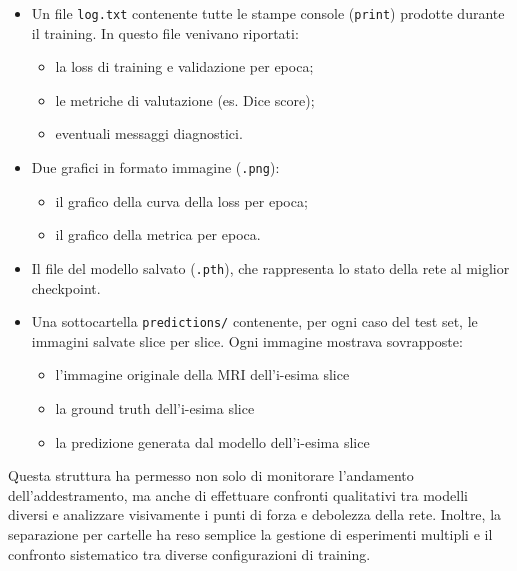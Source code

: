 \begin{itemize}
\item Un file \texttt{log.txt} contenente tutte le stampe console (\texttt{print}) prodotte durante il training. In questo file venivano riportati:
\begin{itemize}
\item la loss di training e validazione per epoca;
\item le metriche di valutazione (es. Dice score);
\item eventuali messaggi diagnostici.
\end{itemize}
\item Due grafici in formato immagine (\texttt{.png}):
\begin{itemize}
    \item il grafico della curva della loss per epoca;
    \item il grafico della metrica per epoca.
\end{itemize}

\item Il file del modello salvato (\texttt{.pth}), che rappresenta lo stato della rete al miglior checkpoint.

\item Una sottocartella \texttt{predictions/} contenente, per ogni caso del test set, le immagini salvate slice per slice. Ogni immagine mostrava sovrapposte:
\begin{itemize}
    \item l’immagine originale della MRI dell'i-esima slice
    \item la ground truth dell'i-esima slice
    \item la predizione generata dal modello dell'i-esima slice
\end{itemize}

\end{itemize}

Questa struttura ha permesso non solo di monitorare l’andamento dell’addestramento, ma anche di effettuare confronti qualitativi tra modelli diversi e analizzare visivamente i punti di forza e debolezza della rete. Inoltre, la separazione per cartelle ha reso semplice la gestione di esperimenti multipli e il confronto sistematico tra diverse configurazioni di training.